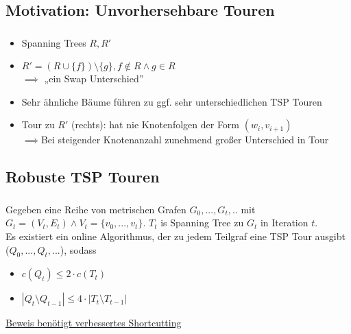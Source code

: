 \subsection{Motivation: Unvorhersehbare Touren}
\begin{frame}
    \frametitle{\insertsubsection}
    \begin{itemize}
        \itemsep\setlength{0.8em}
        \item Spanning Trees $R, R'$
        \item $R' = (R \cup \{f\}) \setminus \{g\}, f \notin R \wedge g \in R$\\$\implies$ „ein Swap Unterschied”
        \vspace{1em}
        \item Sehr ähnliche Bäume führen zu ggf. sehr unterschiedlichen TSP Touren
        \item Tour zu $R'$ (rechts): hat nie Knotenfolgen der Form $(w_i, v_{i+1})$\\$\implies$Bei steigender Knotenanzahl zunehmend großer Unterschied in Tour
    \end{itemize}
\end{frame}

\subsection{Robuste TSP Touren}

\begin{frame}
    \frametitle{\insertsubsection}
    \begin{theorem}
        \vspace{.8em}
        Gegeben eine Reihe von metrischen Grafen $G_0, ..., G_t,..$ mit $G_t = (V_t, E_t) \wedge V_t = \{v_0, ...,v_t\}$. $T_t$ is Spanning Tree zu $G_t$ in Iteration $t$.\\
        \vspace{1em}
        Es existiert ein online Algorithmus, der zu jedem Teilgraf eine TSP Tour ausgibt ($Q_0, ..., Q_t, ...$), sodass
        \vspace{.7em}
        \begin{itemize}
            \label{thm3}
            \itemsep\setlength{0.7em}
            \item $c(Q_t) \leq 2 \cdot c(T_t)$
            \item $|Q_t \setminus Q_{t-1}| \leq 4 \cdot |T_t \setminus T_{t-1}|$
        \end{itemize}
        \vspace{.8em}
    \end{theorem}
    \vspace{1em}
    \underline{Beweis benötigt verbessertes Shortcutting}
\end{frame}



